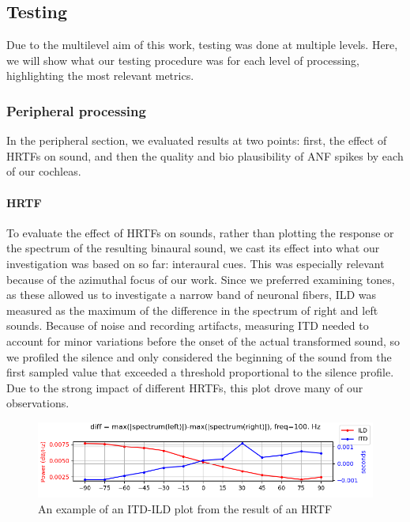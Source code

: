 \documentclass[11pt,a4paper]{article}
\begin{document}
\subsection{Testing}
Due to the multilevel aim of this work, testing was done at multiple levels. Here, we will show what our testing procedure was for each level of processing, highlighting the most relevant metrics.

\subsubsection{Peripheral processing}
In the peripheral section, we evaluated results at two points: first, the effect of HRTFs on sound, and then the quality and bio plausibility of ANF spikes by each of our cochleas.

\paragraph{HRTF}
To evaluate the effect of HRTFs on sounds, rather than plotting the response or the spectrum of the resulting binaural sound, we cast its effect into what our investigation was based on so far: interaural cues. This was especially relevant because of the azimuthal focus of our work. Since we preferred examining tones, as these allowed us to investigate a narrow band of neuronal fibers, ILD was measured as the maximum of the difference in the spectrum of right and left sounds. Because of noise and recording artifacts, measuring ITD needed to account for minor variations before the onset of the actual transformed sound, so we profiled the silence and only considered the beginning of the sound from the first sampled value that exceeded a threshold proportional to the silence profile. Due to the strong impact of different HRTFs, this plot drove many of our observations.
\begin{figure}[H]
    \centering
    \includegraphics[width=1\linewidth]{Images/ild_itd.png}
    \caption{An example of an ITD-ILD plot from the result of an HRTF}
    \label{fig:itd-ild}
\end{figure}
\end{document}
